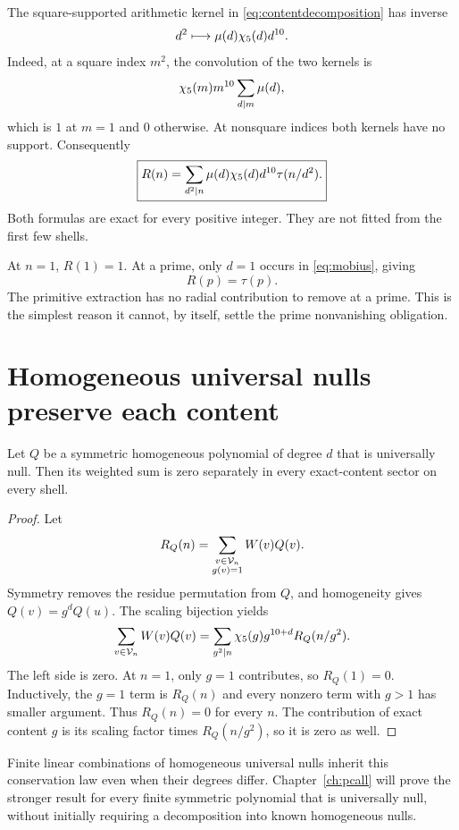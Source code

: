 The square-supported arithmetic kernel in \eqref{eq:contentdecomposition} has inverse
\[
d^2\longmapsto\mu(d)\chi_5(d)d^{10}.
\]
Indeed, at a square index $m^2$, the convolution of the two kernels is
\[
\chi_5(m)m^{10}\sum_{d\mid m}\mu(d),
\]
which is $1$ at $m=1$ and $0$ otherwise. At nonsquare indices both kernels have no support. Consequently
\begin{equation}\label{eq:mobius}
\boxed{R(n)=\sum_{d^2\mid n}\mu(d)\chi_5(d)d^{10}\tau(n/d^2).}
\end{equation}
Both formulas are exact for every positive integer. They are not fitted from the first few shells.

At $n=1$, $R(1)=1$. At a prime, only $d=1$ occurs in \eqref{eq:mobius}, giving
\begin{equation}\label{eq:rprime}
R(p)=\tau(p).
\end{equation}
The primitive extraction has no radial contribution to remove at a prime. This is the simplest reason it cannot, by itself, settle the prime nonvanishing obligation.

\section{Homogeneous universal nulls preserve each content}
\begin{theorem}\label{thm:homcontent}
Let $Q$ be a symmetric homogeneous polynomial of degree $d$ that is universally null. Then its weighted sum is zero separately in every exact-content sector on every shell.
\end{theorem}
\begin{proof}
Let
\[
R_Q(n)=\sum_{\substack{v\in\mathcal V_n\\g(v)=1}}W(v)Q(v).
\]
Symmetry removes the residue permutation from $Q$, and homogeneity gives $Q(v)=g^dQ(u)$. The scaling bijection yields
\begin{equation}\label{eq:thetacontent}
\sum_{v\in\mathcal V_n}W(v)Q(v)
=\sum_{g^2\mid n}\chi_5(g)g^{10+d}R_Q(n/g^2).
\end{equation}
The left side is zero. At $n=1$, only $g=1$ contributes, so $R_Q(1)=0$. Inductively, the $g=1$ term is $R_Q(n)$ and every nonzero term with $g>1$ has smaller argument. Thus $R_Q(n)=0$ for every $n$. The contribution of exact content $g$ is its scaling factor times $R_Q(n/g^2)$, so it is zero as well.
\end{proof}

Finite linear combinations of homogeneous universal nulls inherit this conservation law even when their degrees differ. Chapter~\ref{ch:pcall} will prove the stronger result for every finite symmetric polynomial that is universally null, without initially requiring a decomposition into known homogeneous nulls.

